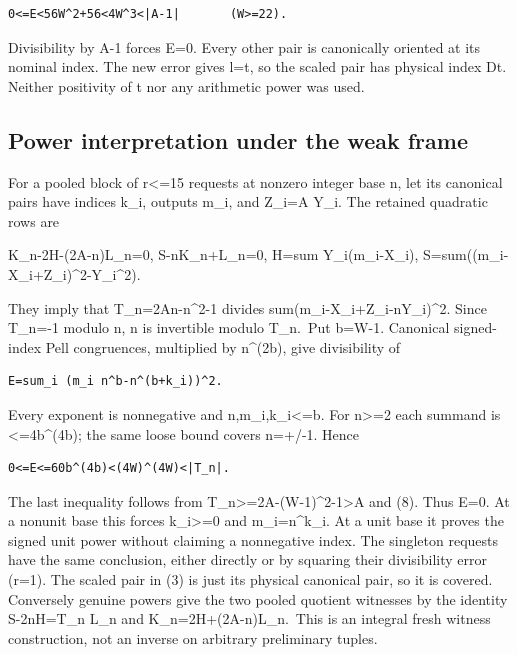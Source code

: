 \begin{verbatim}
0<=E<56W^2+56<4W^3<|A-1|       (W>=22).
\end{verbatim}

Divisibility by A-1 forces E=0. Every other pair is canonically oriented
at its nominal index. The new error gives l=t, so the scaled pair has
physical index Dt. Neither positivity of t nor any arithmetic power was
used.

\subsection{Power interpretation under the weak
frame}\label{power-interpretation-under-the-weak-frame}

For a pooled block of r\textless=15 requests at nonzero integer base n,
let its canonical pairs have indices k\_i, outputs m\_i, and Z\_i=A
Y\_i. The retained quadratic rows are

K\_n-2H-(2A-n)L\_n=0, S-nK\_n+L\_n=0, H=sum Y\_i(m\_i-X\_i),
S=sum((m\_i-X\_i+Z\_i)\^{}2-Y\_i\^{}2).

They imply that T\_n=2An-n\^{}2-1 divides
sum(m\_i-X\_i+Z\_i-nY\_i)\^{}2. Since T\_n=-1 modulo n, n is invertible
modulo T\_n.~Put b=W-1. Canonical signed-index Pell congruences,
multiplied by n\^{}(2b), give divisibility of

\begin{verbatim}
E=sum_i (m_i n^b-n^(b+k_i))^2.
\end{verbatim}

Every exponent is nonnegative and
\textbar n\textbar,\textbar m\_i\textbar,\textbar k\_i\textbar\textless=b.
For \textbar n\textbar\textgreater=2 each summand is
\textless=4b\^{}(4b); the same loose bound covers n=+/-1. Hence

\begin{verbatim}
0<=E<=60b^(4b)<(4W)^(4W)<|T_n|.
\end{verbatim}

The last inequality follows from
\textbar T\_n\textbar\textgreater=2\textbar A\textbar-(W-1)\^{}2-1\textgreater\textbar A\textbar{}
and (8). Thus E=0. At a nonunit base this forces k\_i\textgreater=0 and
m\_i=n\^{}k\_i. At a unit base it proves the signed unit power without
claiming a nonnegative index. The singleton requests have the same
conclusion, either directly or by squaring their divisibility error
(r=1). The scaled pair in (3) is just its physical canonical pair, so it
is covered. Conversely genuine powers give the two pooled quotient
witnesses by the identity S-2nH=T\_n L\_n and K\_n=2H+(2A-n)L\_n.~This
is an integral fresh witness construction, not an inverse on arbitrary
preliminary tuples.

